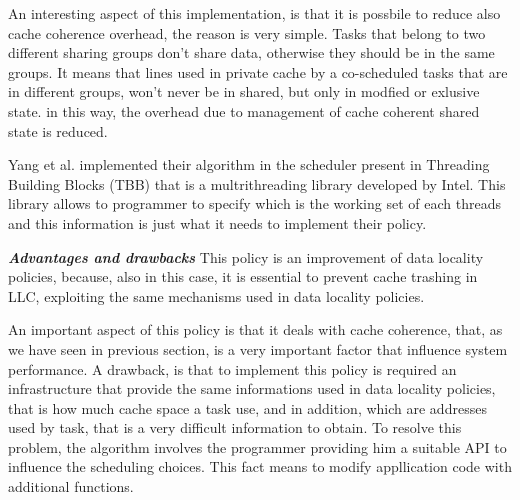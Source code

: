 \begin{description}
An interesting aspect of this implementation, is that it is possbile to reduce also cache coherence overhead, the reason is very simple. Tasks that belong 
to two different sharing groups don't share data, otherwise they should be in the same groups. It means that lines used in private cache by
a co-scheduled tasks that are in different groups, won't never be in shared, but only in modfied or exlusive state. in this way, the overhead due to 
management of cache coherent shared state is reduced. 

Yang et al. implemented their algorithm in the scheduler present in Threading Building Blocks (TBB) that is a multrithreading library developed by Intel. 
This library allows to programmer to specify which is the working set of each threads and this information is just what it needs to implement their policy. 


\textbf{\textit{Advantages and drawbacks}}
This policy is an improvement of data locality policies, because, also in this case, it is essential to prevent cache trashing in LLC,
exploiting the same mechanisms used in data locality policies.

An important aspect of this policy is that it deals with cache coherence, that, as we have seen in previous section, is a very important factor that 
influence system performance. A drawback, is that to implement this policy is required an infrastructure that provide the same informations used in 
data locality policies, that is how much cache space a task use, and in addition, which are addresses used by task, that is a very difficult information
to obtain. To resolve this problem, the algorithm involves the programmer providing him a suitable API to influence the scheduling choices. This fact 
means to modify appllication code with additional functions. 
\end{description}


